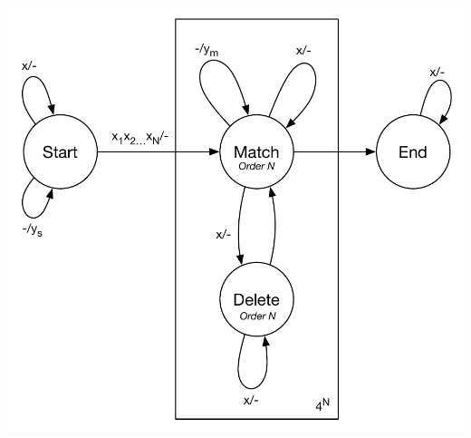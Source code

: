 \documentclass[10pt]{article}
\begin{document}
\includegraphics[width=\textwidth]{figs/Transducer.pdf}
\end{document}
